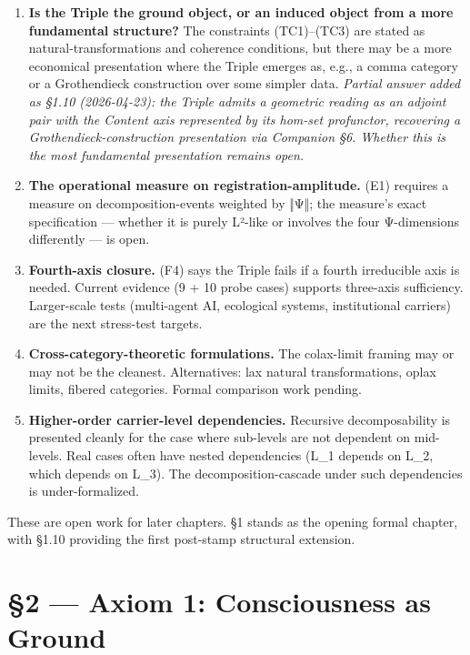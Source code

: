 \documentclass[11pt, openany]{book}
\begin{document}
\begin{enumerate}
\item \textbf{Is the Triple the ground object, or an induced object from a more fundamental structure?} The constraints (TC1)–(TC3) are stated as natural-transformations and coherence conditions, but there may be a more economical presentation where the Triple emerges as, e.g., a comma category or a Grothendieck construction over some simpler data. \textit{Partial answer added as §1.10 (2026-04-23): the Triple admits a geometric reading as an adjoint pair with the Content axis represented by its hom-set profunctor, recovering a Grothendieck-construction presentation via Companion §6. Whether this is the most fundamental presentation remains open.}

\item \textbf{The operational measure on registration-amplitude.} (E1) requires a measure on decomposition-events weighted by ‖Ψ‖; the measure's exact specification --- whether it is purely L²-like or involves the four Ψ-dimensions differently --- is open.

\item \textbf{Fourth-axis closure.} (F4) says the Triple fails if a fourth irreducible axis is needed. Current evidence (9 + 10 probe cases) supports three-axis sufficiency. Larger-scale tests (multi-agent AI, ecological systems, institutional carriers) are the next stress-test targets.

\item \textbf{Cross-category-theoretic formulations.} The colax-limit framing may or may not be the cleanest. Alternatives: lax natural transformations, oplax limits, fibered categories. Formal comparison work pending.

\item \textbf{Higher-order carrier-level dependencies.} Recursive decomposability is presented cleanly for the case where sub-levels are not dependent on mid-levels. Real cases often have nested dependencies (L\_\allowbreak{}1 depends on L\_\allowbreak{}2, which depends on L\_\allowbreak{}3). The decomposition-cascade under such dependencies is under-formalized.
\end{enumerate}

These are open work for later chapters. §1 stands as the opening formal chapter, with §1.10 providing the first post-stamp structural extension.

\chapter{§2 — Axiom 1: Consciousness as Ground}
\end{document}

